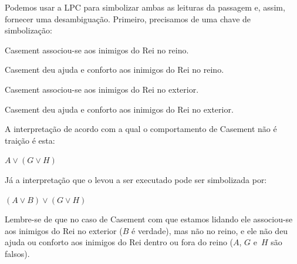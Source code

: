 Podemos usar a LPC para simbolizar ambas as leituras da passagem e, assim, fornecer uma desambiguação. Primeiro, precisamos de uma chave de simbolização:
\begin{ekey}
	\item [A] Casement associou-se aos inimigos do Rei no reino.
	\item [G] Casement deu ajuda e conforto aos inimigos do Rei no reino.
	\item [B] Casement associou-se aos inimigos do Rei no exterior.
	\item [H] Casement deu ajuda e conforto aos inimigos do Rei no exterior.
\end{ekey}
A interpretação de acordo com a qual o comportamento de Casement não é traição é esta:
\begin{earg}
	\item [] $A \lor (G \lor H)$
\end{earg}
Já a interpretação que o levou a ser executado pode ser simbolizada por:
\begin{earg}
	\item [] $(A \lor B) \lor (G \lor H)$
\end{earg}
Lembre-se de que no caso de Casement com que estamos lidando ele associou-se aos inimigos do Rei no exterior ($B$ é verdade), mas não no reino, e ele não deu ajuda ou conforto aos inimigos do Rei dentro ou fora do reino ($A$, $G$ e~$H$ são falsos). 

